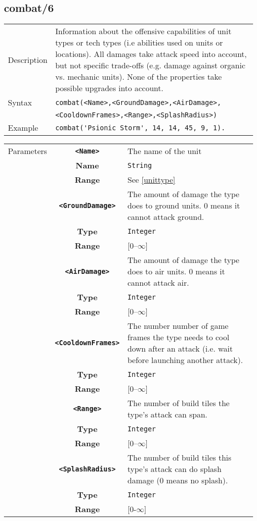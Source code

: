 \subsection{combat/6}
\begin{tabularx}{\textwidth}{lX}
 Description & Information about the offensive capabilities of unit types or tech types (i.e abilities used on units or locations). All damages take attack speed into account, but not specific trade-offs (e.g. damage against organic vs. mechanic units). None of the properties take possible upgrades into account. \\
 Syntax & \verb|combat(<Name>,<GroundDamage>,<AirDamage>,| \\ & \quad \verb|<CooldownFrames>,<Range>,<SplashRadius>)| \\
 Example & \verb|combat('Psionic Storm', 14, 14, 45, 9, 1).| \\
 \end{tabularx}
 \begin{tabularx}{\textwidth}{l | c | p{8cm}|}
 \cline{2-3}
 Parameters & \textbf{\verb|<Name>|} & The name of the unit\\
            & \textbf{Name} & \verb|String| \\
            & \textbf{Range} & See \ref{unittype} \\
            \cline{2-3}
            & \textbf{\verb|<GroundDamage>|} & The amount of damage the type does to ground units. 0 means it cannot attack ground. \\
            & \textbf{Type} & \verb|Integer| \\
            & \textbf{Range} & [0--$\infty$] \\
            \cline{2-3}
            & \textbf{\verb|<AirDamage>|} & The amount of damage the type does to air units. 0 means it cannot attack air. \\
            & \textbf{Type} & \verb|Integer| \\
            & \textbf{Range} & [0--$\infty$] \\
            \cline{2-3}
            & \textbf{\verb|<CooldownFrames>|} & The number number of game frames the type needs to cool down after an attack (i.e. wait before launching another attack).\\
            & \textbf{Type} & \verb|Integer| \\
            & \textbf{Range} & [0--$\infty$] \\
            \cline{2-3}
            & \textbf{\verb|<Range>|} & The number of build tiles the type's attack can span. \\
            & \textbf{Type} & \verb|Integer| \\
            & \textbf{Range} & [0--$\infty$] \\
            \cline{2-3}
            & \textbf{\verb|<SplashRadius>|} & The number of build tiles this type's attack can do splash damage (0 means no splash).\\
            & \textbf{Type} & \verb|Integer| \\
            & \textbf{Range} & [0-$\infty$] \\
            \cline{2-3}
\end{tabularx}